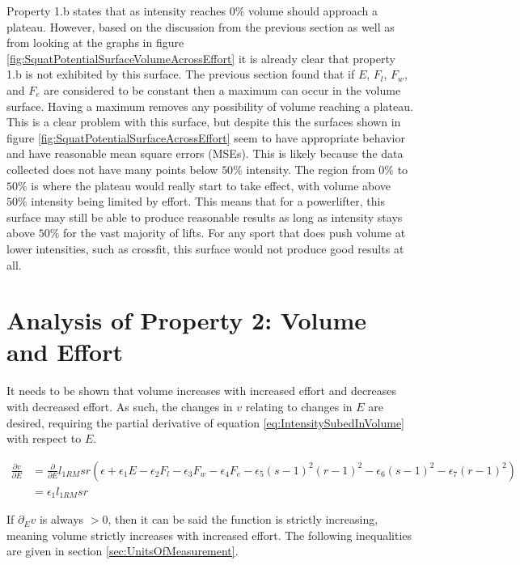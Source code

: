 Property 1.b states that as intensity reaches $0\%$ volume should approach a plateau. However, based on the discussion from the previous section as well as from looking at the graphs in figure \ref{fig:SquatPotentialSurfaceVolumeAcrossEffort} it is already clear that property 1.b is not exhibited by this surface. The previous section found that if $E$, $F_l$, $F_w$, and $F_e$ are considered to be constant then a maximum can occur in the volume surface. Having a maximum removes any possibility of volume reaching a plateau. This is a clear problem with this surface, but despite this the surfaces shown in figure \ref{fig:SquatPotentialSurfaceAcrossEffort} seem to have appropriate behavior and have reasonable mean square errors (MSEs). This is likely because the data collected does not have many points below $50\%$ intensity. The region from $0\%$ to $50\%$ is where the plateau would really start to take effect, with volume above $50\%$ intensity being limited by effort. This means that for a powerlifter, this surface may still be able to produce reasonable results as long as intensity stays above $50\%$ for the vast majority of lifts. For any sport that does push volume at lower intensities, such as crossfit, this surface would not produce good results at all.

\section{Analysis of Property 2: Volume and Effort}
\label{sec:PotentialSurfaceAnalysisOfProperty2}

It needs to be shown that volume increases with increased effort and decreases with decreased effort. As such, the changes in $v$ relating to changes in $E$ are desired, requiring the partial derivative of equation \ref{eq:IntensitySubedInVolume} with respect to $E$.

\begin{equation*}
    \begin{split}
    		\frac{\partial v}{\partial E} & =
    		\frac{\partial}{\partial E} l_{1RM}sr\left( 
    			\epsilon+
    			\epsilon_1 E-
    			\epsilon_2 F_l-
    			\epsilon_3 F_w-
    			\epsilon_4 F_e-
    			\epsilon_5(s-1)^2(r-1)^2-
    			\epsilon_6(s-1)^2-
    			\epsilon_7(r-1)^2
    		\right) \\
    		& =\epsilon_1 l_{1RM} sr
    \end{split}
\end{equation*}

If $\partial_{E}v$ is always $>0$, then it can be said the function is strictly increasing, meaning volume strictly increases with increased effort. The following inequalities are given in section \ref{sec:UnitsOfMeasurement}.

